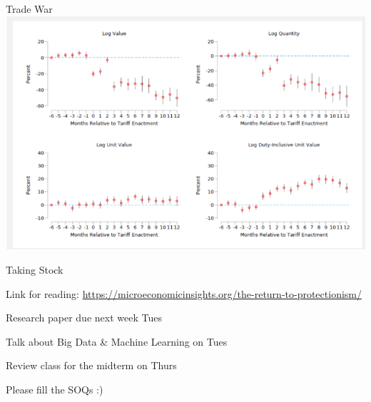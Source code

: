 \documentclass{./../div_teaching_slides}
\begin{document}
\begin{frame}{Trade War}
\centering
\includegraphics[scale=0.4]{eg2_2.png}
\end{frame}


\begin{frame}{Taking Stock}
\begin{witemize}
 \item Link for reading: \href{https://microeconomicinsights.org/the-return-to-protectionism/}{https://microeconomicinsights.org/the-return-to-protectionism/}
  \item Research paper due next week Tues 
  \item Talk about Big Data \& Machine Learning on Tues
  \item Review class for the midterm on Thurs
  \item Please fill the SOQs :)
\end{witemize}

\end{frame}
\end{document}

